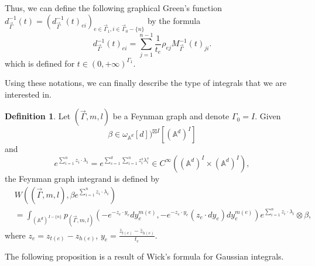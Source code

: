 \documentclass[11pt]{amsart}
\theoremstyle{definition}
\newtheorem{defn}[thm]{Definition}
\theoremstyle{remark}
\numberwithin{equation}{section}
\begin{document}
    Thus, we can define the following graphical Green's function $d^{-1}_{\vec{\Gamma}}(t)=(d^{-1}_{\vec{\Gamma}}(t)
    _{ei})_{e\in\vec{\Gamma}_{1},i\in\vec{\Gamma}_{0}-\{n\}}$ by the formula
    $$
    d^{-1}_{\vec{\Gamma}}(t)_{ei}=\sum_{j=1}^{n-1}\frac{1}{t_{e}}\rho_{ej}M^{-1}_{\vec{\Gamma}}(t)_{ji}.
    $$
    which is defined for $t \in (0,+\infty)^{\Gamma_1}$.


Using these notations, we can finally describe the type of integrals that we are interested in.
\begin{defn}
    Let $(\vec{\Gamma},m,l)$ be a Feynman graph and denote $\Gamma_{0}= I$. Given 
    $$
    \beta\in \omega_{\mathbb{A}^{d}}[d])^{\boxtimes I}[(\mathbb{A}^{d})^{ I}]
    $$
    and
    $$
    e^{\sum_{i=1}^{n}z_{i}\cdot\lambda_{i}}=e^{\sum_{s=1}^{d}\sum_{i=1}^{n}z^{s}_{i}\lambda^{s}_{i}}\in C^{\infty}((\mathbb{A}^{d})^{ I}\times (\mathbb{A}^{d})^{ I}),
    $$
    the Feynman graph integrand is defined by 
    \begin{align*}
        &W((\vec{\Gamma},m,l),\beta e^{\sum_{i=1}^{n}z_{i}\cdot\lambda_{i}})\\
        &=
        \int_{(\mathbb{A}^{d})^{ I-\{n\}}}p_{(\vec{\Gamma},m,l)}(-e^{-z_{e}\cdot y_{e}}dy_{e}^{m(e)},-e^{-z_{e}\cdot y_{e}}(z_{e}\cdot dy_{e})dy_{e}^{m(e)})e^{\sum_{i=1}^{n}z_{i}\cdot\lambda_{i}}\otimes \beta,
    \end{align*}
    where $z_{e}=z_{t(e)}-z_{h(e)}$, $y_{e}=\frac{\bar{z}_{t(e)}-\bar{z}_{h(e)}}{t_{e}}$.
\end{defn}

The following proposition is a result of Wick's formula for Gaussian integrals.
\end{document}
